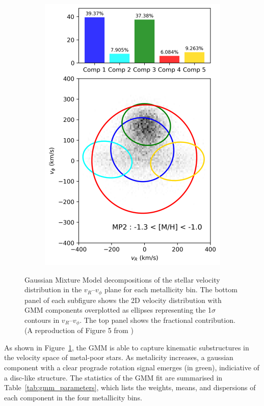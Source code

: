 \documentclass[a4paper,12pt]{article}
\begin{document}
\begin{figure}[h]
\begin{subfigure}[t]{0.24\textwidth}
        \includegraphics[width=\linewidth]{../figures/gmm_MP2.png}
    \end{subfigure}
    
    \caption{
        Gaussian Mixture Model decompositions of the stellar velocity distribution in the $v_R$–$v_\phi$ plane for each metallicity bin. 
        The bottom panel of each subfigure shows the 2D velocity distribution with GMM components overplotted as ellipses representing the 1$\sigma$ contours in $v_R$–$v_\phi$.
        The top panel shows the fractional contribution. (A reproduction of Figure 5 from \citet{zhang2024existencemetalpoordiscmilky})
    }
    \label{fig:gmm_decompositions}
\end{figure}

As shown in Figure~\ref{fig:gmm_decompositions}, the GMM is able to capture kinematic substructures in the velocity space 
of metal-poor stars. As metalicity increases, a gaussian component with a clear prograde rotation signal emerges (in green),
indiciative of a disc-like structure. The statistics of the GMM fit are summarised in Table~\ref{tab:gmm_parameters},
which lists the weights, means, and dispersions of each component in the four metallicity bins. 
\end{document}
